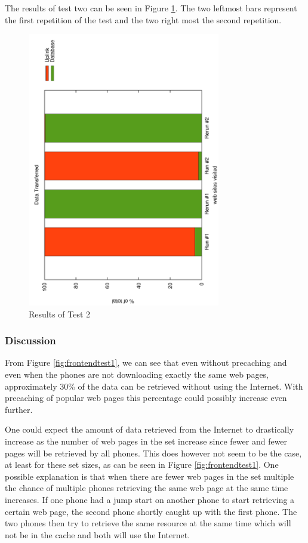 The results of test two can be seen in Figure \ref{fig:frontendtest2}. The two leftmost bars represent the first repetition of the test and the two right most the second repetition.

\begin{figure}
	\centering
		\includegraphics[width=0.75\textwidth, angle=-90]{./img/rerun.pdf}
    	\caption{Results of Test 2}
	\label{fig:frontendtest2}
\end{figure}

\subsubsection{Discussion}

From Figure \ref{fig:frontendtest1}, we can see that even without precaching and even when the phones are not downloading exactly the same web pages, approximately 30\% of the data can be retrieved without using the Internet. With precaching of popular web pages this percentage could possibly increase even further.

One could expect the amount of data retrieved from the Internet to drastically increase as the number of web pages in the set increase since fewer and fewer pages will be retrieved by all phones. This does however not seem to be the case, at least for these set sizes, as can be seen in Figure \ref{fig:frontendtest1}. One possible explanation is that when there are fewer web pages in the set multiple the chance of multiple phones retrieving the same web page at the same time increases. If one phone had a jump start on another phone to start retrieving a certain web page, the second phone shortly caught up with the first phone. The two phones then try to retrieve the same resource at the same time which will not be in the cache and both will use the Internet.


